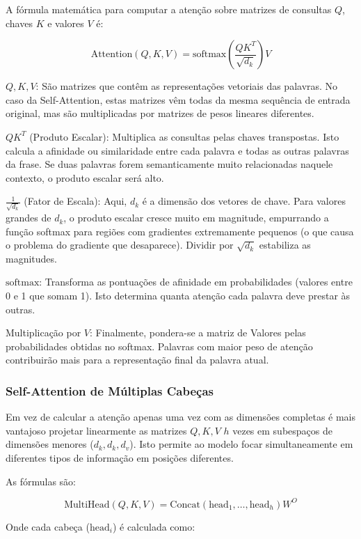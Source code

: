 \documentclass[12pt]{article}
\begin{document}
    A fórmula matemática para computar a atenção sobre matrizes de consultas $Q$, chaves $K$ e valores $V$ é:
    
    $$\text{Attention}(Q, K, V) = \text{softmax}\left(\frac{QK^T}{\sqrt{d_k}}\right)V$$
    
    $Q, K, V$: São matrizes que contêm as representações vetoriais das palavras. No caso da Self-Attention, estas matrizes vêm todas da mesma sequência de entrada original, mas são multiplicadas por matrizes de pesos lineares diferentes.
    
    $QK^T$ (Produto Escalar): Multiplica as consultas pelas chaves transpostas. Isto calcula a afinidade ou similaridade entre cada palavra e todas as outras palavras da frase. Se duas palavras forem semanticamente muito relacionadas naquele contexto, o produto escalar será alto.
    
    $\frac{1}{\sqrt{d_k}}$ (Fator de Escala): Aqui, $d_k$ é a dimensão dos vetores de chave. Para valores grandes de $d_k$, o produto escalar cresce muito em magnitude, empurrando a função softmax para regiões com gradientes extremamente pequenos (o que causa o problema do gradiente que desaparece). Dividir por $\sqrt{d_k}$ estabiliza as magnitudes.
    
    $\text{softmax}$: Transforma as pontuações de afinidade em probabilidades (valores entre 0 e 1 que somam 1). Isto determina quanta atenção cada palavra deve prestar às outras.
    
    Multiplicação por $V$: Finalmente, pondera-se a matriz de Valores pelas probabilidades obtidas no softmax. Palavras com maior peso de atenção contribuirão mais para a representação final da palavra atual.
    
    \subsubsection{Self-Attention de Múltiplas Cabeças}
    
    Em vez de calcular a atenção apenas uma vez com as dimensões completas é mais vantajoso projetar linearmente as matrizes $Q, K, V$ $h$ vezes em subespaços de dimensões menores ($d_k, d_k, d_v$). Isto permite ao modelo focar simultaneamente em diferentes tipos de informação em posições diferentes.
    
    As fórmulas são:
    
    $$\text{MultiHead}(Q, K, V) = \text{Concat}(\text{head}_1, \dots, \text{head}_h)W^O$$
    
    Onde cada cabeça ($\text{head}_i$) é calculada como:
    
\end{document}

